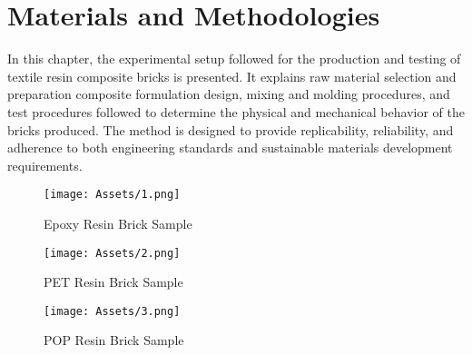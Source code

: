 \chapter{Materials and Methodologies }
In this chapter, the experimental setup followed for the production and testing of textile resin composite bricks is presented. It explains raw material selection and preparation composite formulation design, mixing and molding procedures, and test procedures followed to determine the physical and mechanical behavior of the bricks produced. The method is designed to provide replicability, reliability, and adherence to both engineering standards and sustainable materials development requirements.
\vspace{12pt}
\begin{figure}[h]
	\centering
	\begin{minipage}{0.30\textwidth}
		\centering
		\texttt{[image: Assets/1.png]}
		\caption{Epoxy Resin Brick Sample}
		\label{fig:placeholder}
	\end{minipage}
	\hfill
	\begin{minipage}{0.30\textwidth}
		\centering
		\texttt{[image: Assets/2.png]}
		\caption{PET Resin Brick Sample}
		\label{fig:placeholder}
	\end{minipage}
	\hfill
	\begin{minipage}{0.30\textwidth}
		\centering
		\texttt{[image: Assets/3.png]}
		\caption{POP Resin Brick Sample}
		\label{fig:placeholder}
	\end{minipage}
\end{figure}






